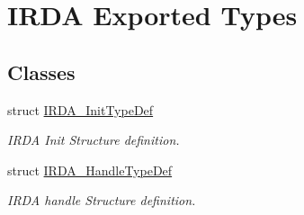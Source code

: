 \hypertarget{group___i_r_d_a___exported___types}{}\section{I\+R\+DA Exported Types}
\label{group___i_r_d_a___exported___types}
\subsection*{Classes}
\begin{DoxyCompactItemize}
\item 
struct \hyperlink{struct_i_r_d_a___init_type_def}{I\+R\+D\+A\+\_\+\+Init\+Type\+Def}
\begin{DoxyCompactList}\small\item\em I\+R\+DA Init Structure definition. \end{DoxyCompactList}\item 
struct \hyperlink{struct_i_r_d_a___handle_type_def}{I\+R\+D\+A\+\_\+\+Handle\+Type\+Def}
\begin{DoxyCompactList}\small\item\em I\+R\+DA handle Structure definition. \end{DoxyCompactList}\end{DoxyCompactItemize}
